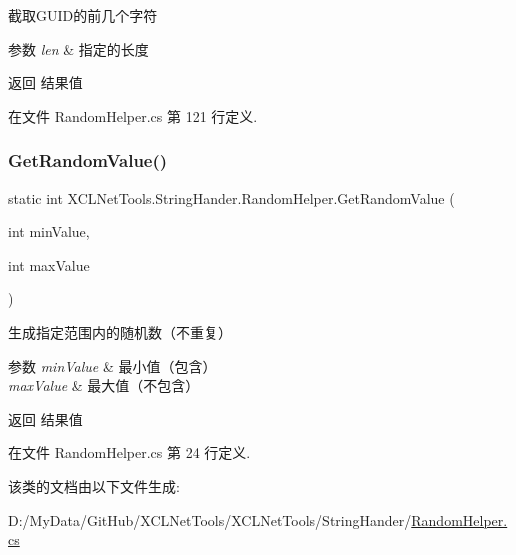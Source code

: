 截取\+G\+U\+I\+D的前几个字符 


\begin{DoxyParams}{参数}
{\em len} & 指定的长度\\
\hline
\end{DoxyParams}
\begin{DoxyReturn}{返回}
结果值
\end{DoxyReturn}


在文件 Random\+Helper.\+cs 第 121 行定义.

\mbox{\label{class_x_c_l_net_tools_1_1_string_hander_1_1_random_helper_a6b5009f83de1931fe3fd19142aa53586}} 
\subsubsection{\texorpdfstring{Get\+Random\+Value()}{GetRandomValue()}}
{\footnotesize\ttfamily static int X\+C\+L\+Net\+Tools.\+String\+Hander.\+Random\+Helper.\+Get\+Random\+Value (\begin{DoxyParamCaption}\item[{int}]{min\+Value,  }\item[{int}]{max\+Value }\end{DoxyParamCaption})\hspace{0.3cm}{\ttfamily [static]}}



生成指定范围内的随机数（不重复） 


\begin{DoxyParams}{参数}
{\em min\+Value} & 最小值（包含）\\
\hline
{\em max\+Value} & 最大值（不包含）\\
\hline
\end{DoxyParams}
\begin{DoxyReturn}{返回}
结果值
\end{DoxyReturn}


在文件 Random\+Helper.\+cs 第 24 行定义.



该类的文档由以下文件生成\+:\begin{DoxyCompactItemize}
\item 
D\+:/\+My\+Data/\+Git\+Hub/\+X\+C\+L\+Net\+Tools/\+X\+C\+L\+Net\+Tools/\+String\+Hander/\hyperlink{_random_helper_8cs}{Random\+Helper.\+cs}\end{DoxyCompactItemize}
